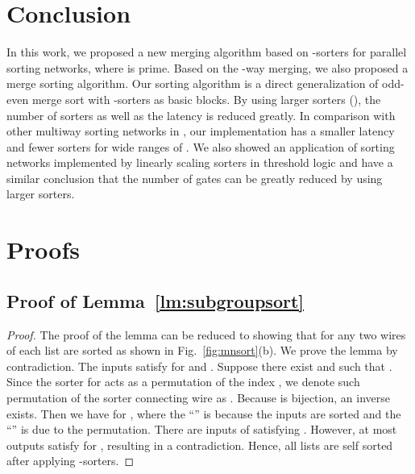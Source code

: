 \documentclass[10pt,journal,cspaper,compsoc]{IEEEtran}
\begin{document}
\section{Conclusion}
\label{sec:conclusion}
In this work, we proposed a new merging algorithm based on -sorters for parallel sorting networks, where  is prime. Based on the -way merging, we also proposed a merge sorting algorithm. Our sorting algorithm is a direct generalization of odd-even merge sort with -sorters as basic blocks.
By using larger sorters (), the number of sorters as well as the latency is reduced greatly. In comparison with other multiway sorting networks in \cite{gao1997sloping}, our implementation has a smaller latency and fewer sorters for wide ranges of . We also showed an application of sorting networks implemented by linearly scaling sorters in threshold logic and have a similar conclusion that the number of gates can be greatly reduced by using larger sorters.




\appendices
\section{Proofs}
\subsection{Proof of Lemma~\ref{lm:subgroupsort}}
\label{pf:subgroupsort}
\begin{proof}
  The proof of the lemma can be reduced to showing that for  any two wires  of each list are sorted as shown in Fig.~\ref{fig:mnsort}(b). We prove the lemma by contradiction.
  The inputs satisfy  for  and .
  Suppose there exist  and  such that . Since the sorter for   acts as a permutation of the index , we denote such permutation of the sorter connecting wire  as . Because  is bijection, an inverse  exists. Then we have  for , where the ``'' is because the inputs are sorted and the ``'' is due to the permutation.
  There are  inputs of  satisfying . However, at most  outputs satisfy  for , resulting in a contradiction. Hence, all lists are self sorted after applying -sorters.
\end{proof}
\end{document}
